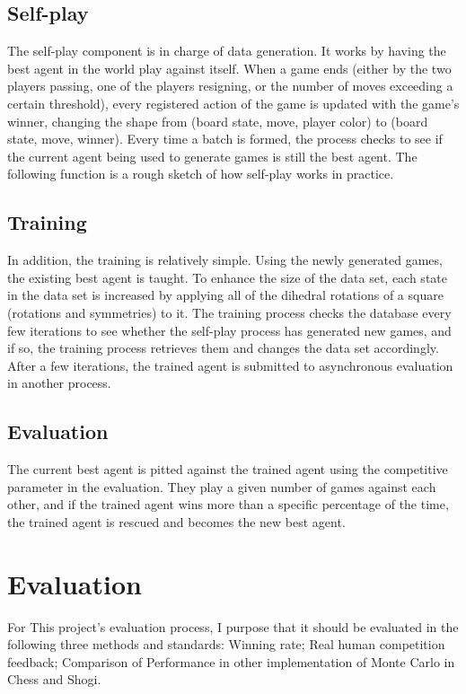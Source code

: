 \documentclass[10pt,twocolumn]{article}
\begin{document}
\begin{itemize}
\subsection{Self-play}
    The self-play component is in charge of data generation. It works by having the best agent in the world play against itself. When a game ends (either by the two players passing, one of the players resigning, or the number of moves exceeding a certain threshold), every registered action of the game is updated with the game's winner, changing the shape from (board state, move, player color) to (board state, move, winner). Every time a batch is formed, the process checks to see if the current agent being used to generate games is still the best agent. The following function is a rough sketch of how self-play works in practice.\cite{Dylan}

\subsection{Training}
    In addition, the training is relatively simple. Using the newly generated games, the existing best agent is taught. To enhance the size of the data set, each state in the data set is increased by applying all of the dihedral rotations of a square (rotations and symmetries) to it. The training process checks the database every few iterations to see whether the self-play process has generated new games, and if so, the training process retrieves them and changes the data set accordingly. After a few iterations, the trained agent is submitted to asynchronous evaluation in another process. \cite{Dylan}

\subsection{Evaluation}
    The current best agent is pitted against the trained agent using the competitive parameter in the evaluation. They play a given number of games against each other, and if the trained agent wins more than a specific percentage of the time, the trained agent is rescued and becomes the new best agent.\cite{Dylan}

\end{itemize}

\section{Evaluation}
    For This project's evaluation process, I purpose that it should be evaluated in the following three methods and standards: Winning rate; Real human competition feedback; Comparison of Performance in other implementation of Monte Carlo in Chess and Shogi.
\end{document}
